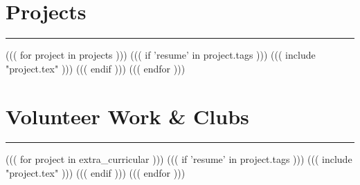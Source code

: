 \documentclass[letterpaper]{article}
\newcommand\textstyleMainBlue[1]{\textcolor[rgb]{0.26666668,0.44705883,0.76862746}{#1}}
\begin{document}
\section{\textstyleMainBlue{Projects}}
\hrule height 0.2pt
\vspace{2pt}
((( for project in projects )))
((( if 'resume' in project.tags )))
((( include "project.tex" )))
((( endif )))
((( endfor )))

\section{\textstyleMainBlue{Volunteer Work \& Clubs}}
\hrule height 0.2pt
\vspace{2pt}
((( for project in extra_curricular )))
((( if 'resume' in project.tags )))
((( include "project.tex" )))
((( endif )))
((( endfor )))
\end{document}

